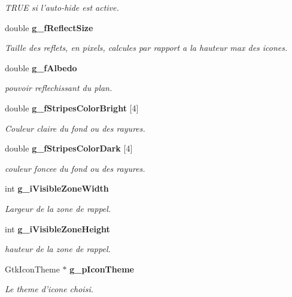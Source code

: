 \begin{CompactItemize}
\begin{CompactList}\small\item\em TRUE si l'auto-hide est active. \item\end{CompactList}\item 
double {\bf g\_\-fReflectSize}
\begin{CompactList}\small\item\em Taille des reflets, en pixels, calcules par rapport a la hauteur max des icones. \item\end{CompactList}\item 
double {\bf g\_\-fAlbedo}
\begin{CompactList}\small\item\em pouvoir reflechissant du plan. \item\end{CompactList}\item 
double {\bf g\_\-fStripesColorBright} [4]
\begin{CompactList}\small\item\em Couleur claire du fond ou des rayures. \item\end{CompactList}\item 
double {\bf g\_\-fStripesColorDark} [4]
\begin{CompactList}\small\item\em couleur foncee du fond ou des rayures. \item\end{CompactList}\item 
int {\bf g\_\-iVisibleZoneWidth}
\begin{CompactList}\small\item\em Largeur de la zone de rappel. \item\end{CompactList}\item 
int {\bf g\_\-iVisibleZoneHeight}
\begin{CompactList}\small\item\em hauteur de la zone de rappel. \item\end{CompactList}\item 
GtkIconTheme $\ast$ {\bf g\_\-pIconTheme}
\begin{CompactList}\small\item\em Le theme d'icone choisi. \item\end{CompactList}\item 

\end{CompactItemize}
